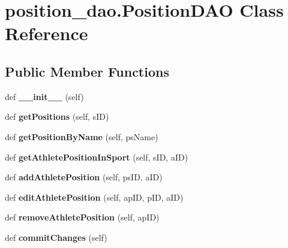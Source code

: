 \hypertarget{classposition__dao_1_1_position_d_a_o}{}\section{position\+\_\+dao.\+Position\+D\+AO Class Reference}
\label{classposition__dao_1_1_position_d_a_o}
\subsection*{Public Member Functions}
\begin{DoxyCompactItemize}
\item 
\mbox{\label{classposition__dao_1_1_position_d_a_o_a89234767235a211e184acdf5a7fb0a13}} 
def {\bfseries \+\_\+\+\_\+init\+\_\+\+\_\+} (self)
\item 
\mbox{\label{classposition__dao_1_1_position_d_a_o_a4d2691773efca9288fe0c3dc0543d945}} 
def {\bfseries get\+Positions} (self, s\+ID)
\item 
\mbox{\label{classposition__dao_1_1_position_d_a_o_ae6799b7b7b8d4776a73628832481aef3}} 
def {\bfseries get\+Position\+By\+Name} (self, ps\+Name)
\item 
\mbox{\label{classposition__dao_1_1_position_d_a_o_aec18df86d820f1b2b9bd5302a112629f}} 
def {\bfseries get\+Athlete\+Position\+In\+Sport} (self, s\+ID, a\+ID)
\item 
\mbox{\label{classposition__dao_1_1_position_d_a_o_afbbaf5b4906c523524ff2acd60cfc6dd}} 
def {\bfseries add\+Athlete\+Position} (self, ps\+ID, a\+ID)
\item 
\mbox{\label{classposition__dao_1_1_position_d_a_o_ad43ac192c9887342478b01f3ea6d2a92}} 
def {\bfseries edit\+Athlete\+Position} (self, ap\+ID, p\+ID, a\+ID)
\item 
\mbox{\label{classposition__dao_1_1_position_d_a_o_ae13bba5ff76d142b461a9d5620d1421e}} 
def {\bfseries remove\+Athlete\+Position} (self, ap\+ID)
\item 
\mbox{\label{classposition__dao_1_1_position_d_a_o_a8f413e98cfdda7ea47e9eb69bfa8a751}} 
def {\bfseries commit\+Changes} (self)
\end{DoxyCompactItemize}
